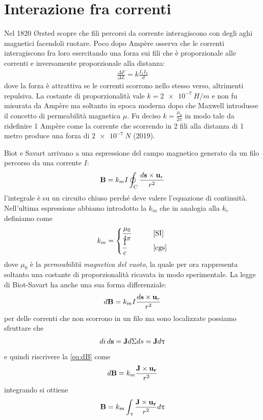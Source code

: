 \section{Interazione fra correnti}
Nel 1820 Ørsted scopre che fili percorsi da corrente interagiscono con degli aghi magnetici facendoli ruotare.
Poco dopo Ampère osserva che le correnti interagiscono fra loro esercitando una forza sui fili che è proporzionale alle correnti e inversamente 
proporzionale alla distanza:
\begin{align}
  \frac{\Delta F}{\Delta L} = k\frac{I_1 I_2}{d}
\end{align}
dove la forza è attrattiva se le correnti scorrono nello stesso verso, altrimenti repulsiva.
La costante di proporzionalità vale $ k = \SI{2e-7}{H/m}$ e non fu misurata da Ampère ma soltanto in epoca moderna dopo che Maxwell introdusse il 
concetto di permeabilità magnetica $ \mu $. Fu deciso $ k = \frac{\mu_0}{2\pi}  $ in modo tale da ridefinire 1 Ampère come la corrente che scorrendo in 2 
fili alla distanza di 1 metro produce una forza di $ \SI{2e-7}{N} $ (2019).

Biot e Savart arrivano a una espressione del campo magnetico generato da un filo percorso da una corrente $ I $:
\begin{equation} \label{eq:B_integrale_di_dB}
  \mathbf{B} =  k_m I \oint_C \frac{d\mathbf{s}\times\mathbf{u}_r}{r^2}
\end{equation}
l'integrale è su un circuito chiuso perché deve valere l'equazione di continuità. Nell'ultima espressione abbiamo introdotto la $ k_m $ che in analogia 
alla $ k_e $ definiamo come
\begin{align*}
  k_m = 
  \begin{cases}
    \displaystyle \frac{\mu_0}{4\pi} \qquad & \textnormal{[SI]} \\
    \displaystyle \frac1c \qquad & \textnormal{[cgs]}
  \end{cases}
\end{align*}
dove $ \mu_0 $ è la \textit{permeabilità magnetica del vuoto}, la quale per ora rappresenta soltanto una costante di proporzionalità ricavata in modo 
sperimentale. La legge di Biot-Savart ha anche una sua forma differenziale:
\begin{equation} \label{eq:dB}
  d \mathbf{B} =  k_m I \frac{d\mathbf{s}\times\mathbf{u}_r}{r^2}
\end{equation}
per delle correnti che non scorrono in un filo ma sono localizzate possiamo sfruttare che
\begin{align}
  di\,d\mathbf{ s } =  \mathbf{ J } d\Sigma ds = \mathbf{ J }d\uptau
\end{align}
e quindi riscrivere la \eqref{eq:dB} come
\begin{equation}
  d\mathbf{ B } = k_m \frac{\mathbf{ J }\times\mathbf{ u_r }}{r^2}
\end{equation}
integrando si ottiene
\begin{equation}
  \mathbf{ B } = k_m \int_\uptau \frac{\mathbf{ J }\times\mathbf{ u_r }}{r^2} d\uptau
\end{equation}


